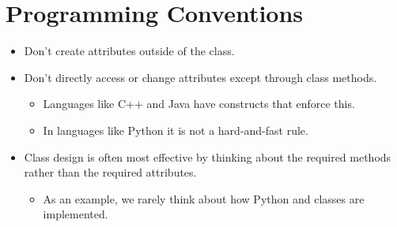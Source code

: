 \documentclass[letterpaper,10pt,english]{sphinxmanual}
\begin{document}
\section{Programming Conventions}
\label{\detokenize{lecture_notes/lec18_classes1:programming-conventions}}\begin{itemize}
\item {} 
Don’t create attributes outside of the class.

\item {} 
Don’t directly access or change attributes except through class
methods.
\begin{itemize}
\item {} 
Languages like C++ and Java have constructs that enforce this.

\item {} 
In languages like Python it is not a hard-and-fast rule.

\end{itemize}

\item {} 
Class design is often most effective by thinking about the required
methods rather than the required attributes.
\begin{itemize}
\item {} 
As an example, we rarely think about how Python  and
 classes are implemented.

\end{itemize}

\end{itemize}
\end{document}
